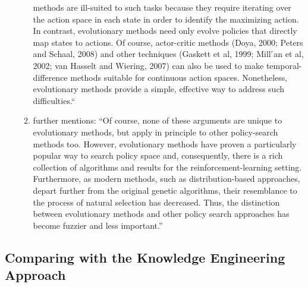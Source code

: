 \begin{itemize}
\begin{enumerate}
					methods are ill-suited to such tasks because they require iterating over the action
					space in each state in order to identify the maximizing action. In contrast,
					evolutionary methods need only evolve policies that directly map states to actions. Of
					course, actor-critic methods (Doya, 2000; Peters and Schaal, 2008) and other techniques
					(Gaskett et al, 1999; Mill ́an et al, 2002; van Hasselt and Wiering, 2007) can
					also be used to make temporal-difference methods suitable for continuous action
					spaces. Nonetheless, evolutionary methods provide a simple, effective way to
					address such difficulties.``
				\item \citet{Whiteson2012} further mentions: ``Of course, none
					of these arguments are unique to evolutionary methods, but
					apply in principle to other policy-search methods too.
					However, evolutionary methods have proven a particularly
					popular way to search policy space and, consequently, there
					is a rich collection of algorithms and results for the
					reinforcement-learning setting. Furthermore, as modern
					methods, such as distribution-based approaches, depart
					further from the original genetic algorithms, their
					resemblance to the process of natural selection has
					decreased. Thus, the distinction between evolutionary
					methods and other policy search approaches has become
					fuzzier and less important.''
		  \end{enumerate}
\end{itemize}
\subsection{Comparing with the Knowledge Engineering Approach}
